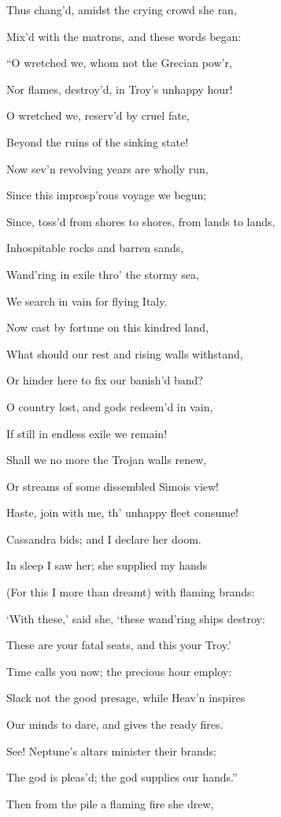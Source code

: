 Thus chang’d, amidst the crying crowd she ran,

Mix’d with the matrons, and these words began:

“O wretched we, whom not the Grecian pow’r,

Nor flames, destroy’d, in Troy’s unhappy hour!

O wretched we, reserv’d by cruel fate,

Beyond the ruins of the sinking state!

Now sev’n revolving years are wholly run,

Since this improsp’rous voyage we begun;

Since, toss’d from shores to shores, from lands to lands,

Inhospitable rocks and barren sands,

Wand’ring in exile thro’ the stormy sea,

We search in vain for flying Italy.

Now cast by fortune on this kindred land,

What should our rest and rising walls withstand,

Or hinder here to fix our banish’d band?

O country lost, and gods redeem’d in vain,

If still in endless exile we remain!

Shall we no more the Trojan walls renew,

Or streams of some dissembled Simois view!

Haste, join with me, th’ unhappy fleet consume!

Cassandra bids; and I declare her doom.

In sleep I saw her; she supplied my hands

(For this I more than dreamt) with flaming brands:

‘With these,’ said she, ‘these wand’ring ships destroy:

These are your fatal seats, and this your Troy.’

Time calls you now; the precious hour employ:

Slack not the good presage, while Heav’n inspires

Our minds to dare, and gives the ready fires.

See! Neptune’s altars minister their brands:

The god is pleas’d; the god supplies our hands.”

Then from the pile a flaming fire she drew,


